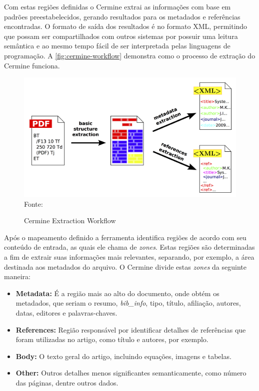 Com estas regiões definidas o Cermine extrai as informações com base em padrões preestabelecidos, gerando resultados para os metadados e referências encontradas. O formato de saída dos resultados é no formato XML, permitindo que possam ser compartilhados com outros sistemas por possuir uma leitura semântica e ao mesmo tempo fácil de ser interpretada pelas linguagens de programação. A \autoref{fig:cermine-workflow} demonstra como o processo de extração do Cermine funciona.

\begin{figure}[h!]
    \centering
    \caption{Cermine Extraction Workflow}
    \label{fig:cermine-workflow}
    \includegraphics[width=0.7\linewidth]{./assets/images/cermine}
    \center\footnotesize{Fonte: \cite{cermine}}
\end{figure}

Após o mapeamento definido a ferramenta identifica regiões de acordo com seu conteúdo de entrada, as quais ele chama de \textit{zones}. Estas regiões são determinadas a fim de extrair suas informações mais relevantes, separando, por exemplo, a área destinada aos metadados do arquivo. O Cermine divide estas \textit{zones} da seguinte maneira:

\begin{itemize}

    \item \textbf{Metadata:} É a região mais ao alto do documento, onde obtém os metadados, que seriam o resumo, \textit{bib\_info}, tipo, título, afiliação, autores, datas, editores e palavras-chaves.

    \item \textbf{References:} Região responsável por identificar detalhes de referências que foram utilizadas no artigo, como título e autores, por exemplo.

    \item \textbf{Body:} O texto geral do artigo, incluindo equações, imagens e tabelas.

    \item \textbf{Other:} Outros detalhes menos significantes semanticamente, como número das páginas, dentre outros dados.

\end{itemize}

